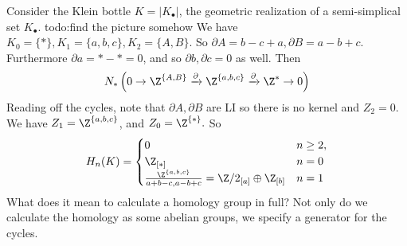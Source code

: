 \begin{example}
    Consider the Klein bottle $K=|K_{\bullet}|$, the geometric realization of a semi-simplical set $K_{\bullet}$. {\color{red}todo:find the picture somehow}  We have $K_0=\{*\} ,K_1=\{a,b,c\} , K_2=\{A,B\} $. So $\partial A=b-c+a, \partial B=a-b+c$. Furthermore $\partial a= *-*=0$, and so $\partial b,\partial c=0$ as well. Then \[
        N_*\left( 0 \to \Z^{\{A,B\} }\xrightarrow{\partial } \Z^{\{a,b,c\} }\xrightarrow{\partial } \Z^{*}\to 0\right) 
    \] Reading off the cycles, note that $\partial A,\partial B$ are LI so there is no kernel and $Z_2=0$. We have $Z_1=\Z^{\{a,b,c\} }$, and $Z_0=\Z^{\{*\} }. $ So \[
    H_n (K)=
    \begin{cases}
        0 & n\geq 2,\\
        \Z_{[*]} & n=0\\
        \frac{\Z^{\{a,b,c\} }}{a+b-c,a-b+c}=\Z /2_{[a]} \oplus \Z_{[b]} & n=1
    \end{cases}
    \] What does it mean to calculate a homology group in full? Not only do we calculate the homology as some abelian groups, we specify a generator for the cycles.
\end{example}
